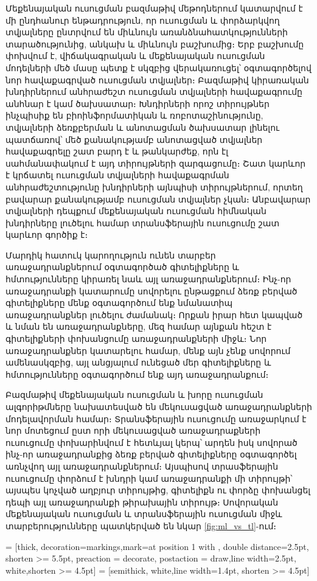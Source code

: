 \documentclass[12pt]{article}
\begin{document}
Մեքենայական ուսուցման բազմաթիվ մեթոդներում կատարվում է մի ընդհանուր ենթադրություն, որ ուսուցման և փորձարկվող տվյալները ընտրվում են միևնույն առանձնահատկությունների տարածությունից,  անկախ և միևնույն բաշխումից։ Երբ բաշխումը փոխվում է, վիճակագրական և մեքենայական ուսուցման մոդելների մեծ մասը պետք է սկզբից վերակառուցել՝ օգտագործելով նոր հավաքագրված ուսուցման տվյալներ։ Բազմաթիվ կիրառական խնդիրներում անհրաժեշտ  ուսուցման տվյալների հավաքագրումը  անհնար է կամ ծախսատար։   Խնդիրների որոշ տիրույթներ ինչպիսիք են բիոինֆորմատիկան և ռոբոտաշինությունը, տվյալների ձեռքբերման և անոտացման ծախսատար լինելու պատճառով՝  մեծ քանակությամբ անոտացված տվյալներ հավաքագրելը  շատ բարդ է և թանկարժեք, որն էլ սահմանափակում է այդ տիրույթների զարգացումը։ Շատ կարևոր է կրճատել ուսուցման տվյալների   հավաքագրման անհրաժեշտությունը խնդիրների այնպիսի տիրույթներում, որտեղ բավարար քանակությամբ ուսուցման տվյալներ չկան։ Անբավարար տվյալների դեպքում մեքենայական ուսուցման  հիմնական խնդիրները լուծելու համար տրանսֆերային ուսուցումը  շատ կարևոր գործիք է։ \par Մարդիկ հատուկ կարողություն ունեն տարբեր առաջադրանքներում օգտագործած գիտելիքները և հմտությունները կիրառել  նաև այլ առաջադրանքներում։ Ինչ-որ առաջադրանքի կատարումը սովորելու ընթացքում ձեռք բերված գիտելիքները մենք օգտագործում ենք նմանատիպ առաջադրանքներ լուծելու ժամանակ։  Որքան իրար հետ կապված և նման են առաջադրանքները,  մեզ համար այնքան հեշտ է  գիտելիքների փոխանցումը առաջադրանքների միջև։ Նոր առաջադրանքներ կատարելու համար, մենք այն չենք սովորում ամենասկզբից, այլ անցյալում ունեցած մեր գիտելիքները և հմտությունները օգտագործում ենք այդ առաջադրանքում։

 \par Բազմաթիվ մեքենայական ուսուցման և խորը ուսուցման ալգորիթմները նախատեսված են մեկուսացված առաջադրանքների մոդելավորման համար։  Տրանսֆերային ուսուցումը առաջարկում է նոր մոտեցում ըստ որի մեկուսացված առաջադրաքների ուսուցումը փոխարինվում է հետևյալ կերպ՝ արդեն իսկ սովորած ինչ-որ առաջադրանքից ձեռք բերված գիտելիքները օգտագործել առնչվող այլ  առաջադրանքներում։  Այսպիսով տրասֆերային ուսուցումը փորձում է խնդրի  կամ առաջադրանքի մի տիրույթի՝ այսպես կոչված աղբյուր տիրույթից, գիտելիքն ու փորձը փոխանցել դեպի այլ  առաջադրանքի թիրախային տիրույթ։ Սովորական մեքենայական ուսուցման և տրանսֆերային ուսուցման միջև տարբերությունները պատկերված են նկար \ref{fig:ml_vs_tl}-ում։


 = [thick, decoration={markings,mark=at position
   1 with {}},
   double distance=2.5pt, shorten >= 5.5pt,
   preaction = {decorate},
   postaction = {draw,line width=2.5pt, white,shorten >= 4.5pt}]
 = [semithick, white,line width=1.4pt, shorten >= 4.5pt]
\end{document}

